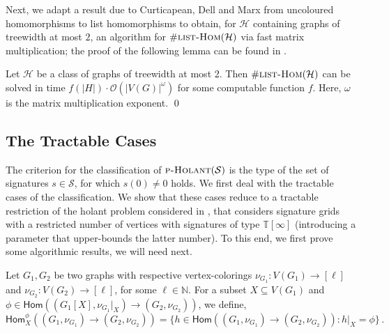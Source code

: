 \documentclass[authorcolumns,numberwithinsect]{no-lipics-v2022}
\newcommand{\homs}[2]{\mathsf{Hom}(#1 \to #2)}
\newcommand{\parthomsX}[3]{\mathsf{Hom}^{\phi}_{#3}(#1 \to #2)}
\newcommand{\listhomsprob}
{\text{\sc{list-Hom}}}
\newcommand{\holantprob}{\text{\sc{p-Holant}}}
\begin{document}
Next, we adapt a result due to Curticapean, Dell and Marx from uncoloured homomorphisms to list homomorphisms to obtain, for $\mathcal{H}$ containing graphs of treewidth at most $2$, an algorithm for $\#\listhomsprob(\mathcal{H})$ via fast matrix multiplication; the proof of the following lemma can be found in .

\begin{lemma}\label{lem:listHomsMatrix}
Let $\mathcal{H}$ be a class of graphs of treewidth at most 2.
Then $\#\listhomsprob(\mathcal{H})$ can be solved in time $f(|H|)\cdot \mathcal{O}(|V(G)|^{\omega})$ for some computable function $f$. Here, $\omega$ is the matrix multiplication exponent. \qed
\end{lemma}

\subsection{The Tractable Cases}
The criterion for the classification of $\holantprob(\mathcal{S})$ is the type of the set of signatures $s \in \mathcal{S}$, for which $s(0) \neq 0$ holds. We first deal with the tractable cases of the classification. We show that these cases reduce to a tractable restriction of the holant problem considered in , that considers signature grids with a restricted number of vertices with signatures of type $\mathbb{T}[\infty]$ (introducing a parameter that upper-bounds the latter number). To this end, we first prove some algorithmic results, we will need next.



\begin{definition}
Let $G_1, G_2$ be two graphs with respective vertex-colorings $\nu_{G_1} : V(G_1) \to [\ell]$ and $\nu_{G_2} : V(G_2) \to [\ell]$, for some $\ell \in \mathbb{N}$. For a subset $X \subseteq V(G_1)$ and $\phi \in \homs{(G_1[X], \nu_{G_1}|_{X})}{(G_2, \nu_{G_2})}$, we define,
\begin{equation*}
\parthomsX{(G_1, \nu_{G_1})}{(G_2, \nu_{G_2})}{X} = \{h \in \homs{(G_1, \nu_{G_1})}{(G_2, \nu_{G_2})} : h|_{X} = \phi\}\,.    
\end{equation*}
\end{definition}
\end{document}
